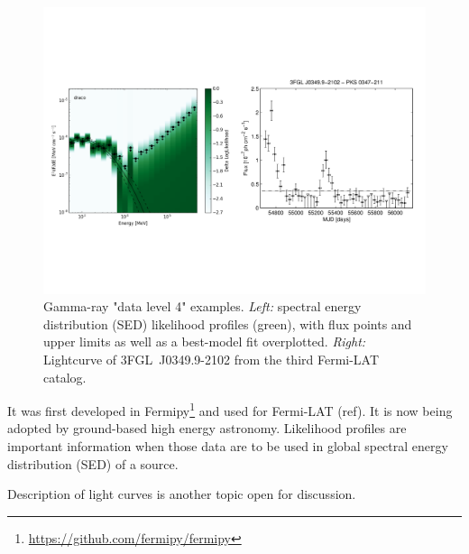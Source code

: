 \begin{figure}[tb]
\centerline{\includegraphics[width=\textwidth]{figures/dl4-examples}}
\caption{
Gamma-ray "data level 4" examples. \emph{Left:} spectral energy distribution (SED) likelihood profiles (green), with flux points and upper limits as well
as a best-model fit overplotted. \emph{Right:} Lightcurve of 3FGL~J0349.9-2102 from the third Fermi-LAT catalog.
}
\label{fig:dl4-examples}
\end{figure}

It was first developed in Fermipy\footnote{\url{https://github.com/fermipy/fermipy}} and used for Fermi-LAT (ref). It is now being adopted by ground-based high energy astronomy. Likelihood profiles are important information when those data are to be used in global spectral energy distribution (SED) of a source. 

Description of light curves is another topic open for discussion. 
